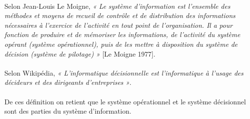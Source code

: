   \paragraph{}
  Selon Jean-Louis Le Moigne,  \textit{« Le système d’information est l’ensemble des méthodes et moyens de recueil de contrôle et de distribution des informations nécessaires à l’exercice de l’activité en tout point de l’organisation. Il a pour fonction de produire et de mémoriser les informations, de l’activité du système opérant (système opérationnel), puis de les mettre à disposition du système de décision (système de pilotage) »} [Le Moigne 1977].
  \paragraph{}
  Selon Wikipédia,\textit{ « L’informatique décisionnelle est l'informatique à l'usage des décideurs et des dirigeants    d'entreprises »}.
  \paragraph{}
  De ces définition on retient que le système opérationnel et le système décisionnel sont des parties du                  système d’information. 
 


